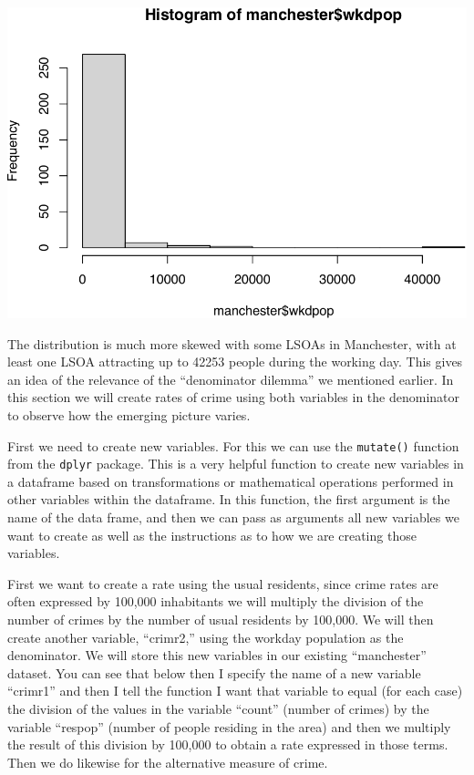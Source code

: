 \documentclass[
]{book}
\newenvironment{Shaded}{\begin{snugshade}}{\end{snugshade}}
\newcommand{\FunctionTok}[1]{\textcolor[rgb]{0.00,0.00,0.00}{#1}}
\newcommand{\NormalTok}[1]{#1}
\newcommand{\SpecialCharTok}[1]{\textcolor[rgb]{0.00,0.00,0.00}{#1}}
\begin{document}
\begin{Shaded}
\end{Shaded}

\includegraphics{crime_mapping_files/figure-latex/unnamed-chunk-82-1.pdf}

The distribution is much more skewed with some LSOAs in Manchester, with at least one LSOA attracting up to 42253 people during the working day. This gives an idea of the relevance of the ``denominator dilemma'' we mentioned earlier. In this section we will create rates of crime using both variables in the denominator to observe how the emerging picture varies.

First we need to create new variables. For this we can use the \texttt{mutate()} function from the \texttt{dplyr} package. This is a very helpful function to create new variables in a dataframe based on transformations or mathematical operations performed in other variables within the dataframe. In this function, the first argument is the name of the data frame, and then we can pass as arguments all new variables we want to create as well as the instructions as to how we are creating those variables.

First we want to create a rate using the usual residents, since crime rates are often expressed by 100,000 inhabitants we will multiply the division of the number of crimes by the number of usual residents by 100,000. We will then create another variable, ``crimr2,'' using the workday population as the denominator. We will store this new variables in our existing ``manchester'' dataset. You can see that below then I specify the name of a new variable ``crimr1'' and then I tell the function I want that variable to equal (for each case) the division of the values in the variable ``count'' (number of crimes) by the variable ``respop'' (number of people residing in the area) and then we multiply the result of this division by 100,000 to obtain a rate expressed in those terms. Then we do likewise for the alternative measure of crime.
\end{document}
